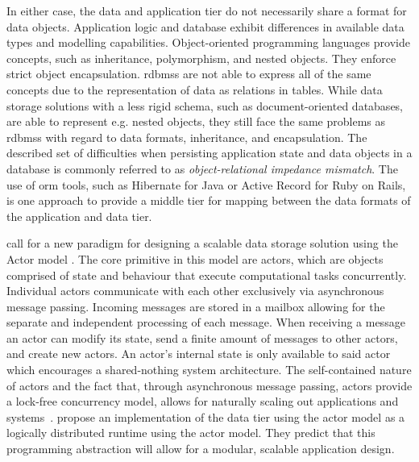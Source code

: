   In either case, the data and application tier do not necessarily share a format for data objects.
  Application logic and database exhibit differences in available data types and modelling capabilities.
  Object-oriented programming languages provide concepts, such as inheritance, polymorphism, and nested objects.
  They enforce strict object encapsulation.
  \glspl{rdbms} are not able to express all of the same concepts due to the representation of data as relations in tables. %
  While data storage solutions with a less rigid schema, such as document-oriented databases, are able to represent e.g. nested objects, they still face the same problems as \glspl{rdbms} with regard to data formats, inheritance, and encapsulation.
  The described set of difficulties when persisting application state and data objects in a database is commonly referred to as \textit{object-relational impedance mismatch}.
  The use of \gls{orm} tools, such as Hibernate for Java or Active Record for Ruby on Rails, is one approach to provide a middle tier for mapping between the data formats of the application and data tier.

  \citeauthor{manifesto} call for a new paradigm for designing a scalable data storage solution using the Actor model \cite{manifesto}.
  The core primitive in this model are actors, which are objects comprised of state and behaviour that execute computational tasks concurrently.
  Individual actors communicate with each other exclusively via asynchronous message passing.
  Incoming messages are stored in a mailbox allowing for the separate and independent processing of each message.
  When receiving a message an actor can modify its state, send a finite amount of messages to other actors, and create new actors.
  An actor's internal state is only available to said actor which encourages a shared-nothing system architecture.
  The self-contained nature of actors and the fact that, through asynchronous message passing, actors provide a lock-free concurrency model, allows for naturally scaling out applications and systems~\cite{vernon2015reactive}.
  \citeauthor{manifesto} propose an implementation of the data tier using the actor model as a logically distributed runtime using the actor model.
  They predict that this programming abstraction will allow for a modular, scalable application design.

